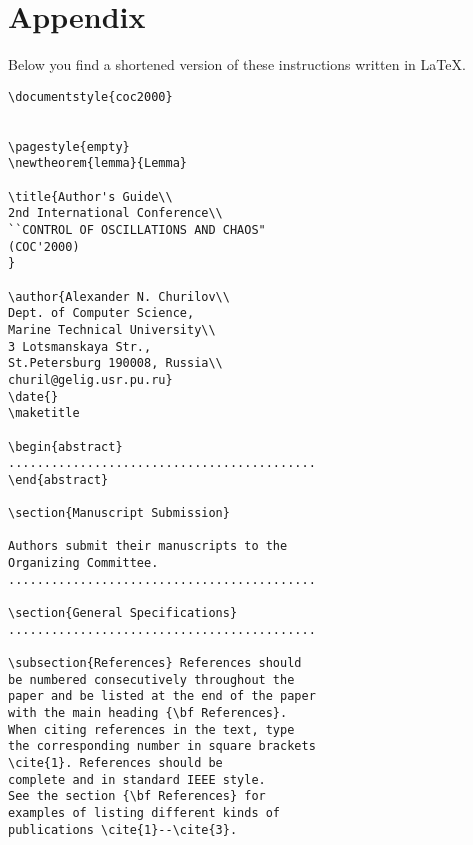 \section*{Appendix}
Below you find a shortened version of these
instructions written in \LaTeX.
\begin{verbatim}
\documentstyle{coc2000}


\pagestyle{empty}
\newtheorem{lemma}{Lemma}

\title{Author's Guide\\
2nd International Conference\\
``CONTROL OF OSCILLATIONS AND CHAOS"
(COC'2000)
}

\author{Alexander N. Churilov\\
Dept. of Computer Science,
Marine Technical University\\
3 Lotsmanskaya Str.,
St.Petersburg 190008, Russia\\
churil@gelig.usr.pu.ru}
\date{}
\maketitle

\begin{abstract}
...........................................
\end{abstract}

\section{Manuscript Submission}

Authors submit their manuscripts to the
Organizing Committee.
...........................................

\section{General Specifications}
...........................................

\subsection{References} References should
be numbered consecutively throughout the
paper and be listed at the end of the paper
with the main heading {\bf References}.
When citing references in the text, type
the corresponding number in square brackets
\cite{1}. References should be
complete and in standard IEEE style.
See the section {\bf References} for
examples of listing different kinds of
publications \cite{1}--\cite{3}.


\end{verbatim}
